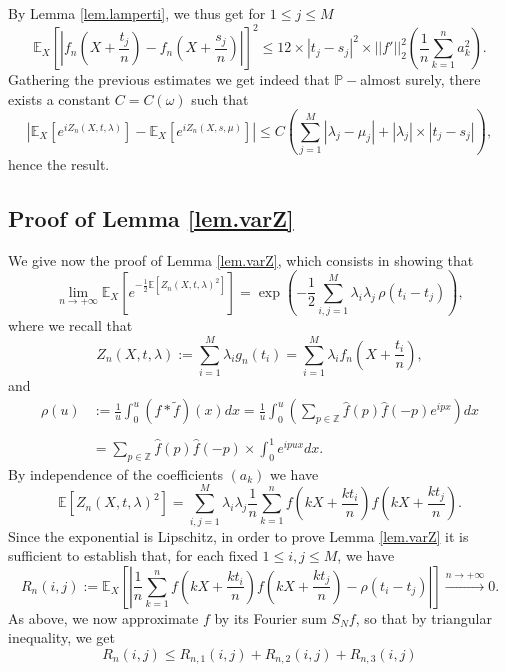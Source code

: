 \documentclass{svproc}
\newcommand \Esp {\mathbb{E}}
\newcommand \Z {\mathbb{Z}}
\begin{document}
By Lemma \ref{lem.lamperti}, we thus get for $1 \leq j \leq M$
\[
\displaystyle{ \mathbb E_X \left[\left| f_n\left(X+\frac{t_j}{n}\right)-f_n\left(X+\frac{s_j}{n}\right)\right|  \right]^2} \displaystyle{\leq   12 \times |t_j-s_j|^2 \times ||f'||_2^2 \left(  \frac{1}{n} \sum_{k=1}^n a_k^2   \right).}
\]
Gathering the previous estimates we get indeed that $\mathbb P-$almost surely, there exists a constant $C=C(\omega)$ such that 
\[
\left| \Esp_X \left[e^{iZ_n(X,t,\lambda)} \right] -\Esp_X \left[e^{iZ_n(X,s,\mu)} \right]  \right|\leq C\left(\sum_{j=1}^M \left| \lambda_j-\mu_j\right| +|\lambda_j|  \times|t_j - s_j|\right), 
\]
hence the result.




\subsection{Proof of Lemma \ref{lem.varZ}}\label{sec.varZ}
We give now the proof of Lemma \ref{lem.varZ}, which consists in showing that 
\[
\lim_{n \to +\infty}\Esp_X\left[e^{-\frac{1}{2}\Esp[Z_n(X,t,\lambda)^2]}\right]=\exp\left(-\frac{1}{2}\sum_{i,j=1}^{M} \lambda_i \lambda_j \, \rho(t_i-t_j) \right),
\]
where we recall that 
\[
Z_n(X,t,\lambda):=\sum_{i=1}^{M}\lambda_i g_n(t_i) =\sum_{i=1}^{M}\lambda_i f_n\left(X+\frac{t_i}{n}\right),
\]
and 
\[
\begin{array}{ll}
\rho(u) & \displaystyle :=\frac{1}{u}\int_0^{u}(f\ast \widetilde{f})(x)dx=\frac{1}{u}\int_0^{u}\left(\sum_{p\in \Z}\widehat{f}(p)\widehat{f}(-p) e^{i p x}\right) dx\\ 
\\
& \displaystyle= \sum_{p\in \Z}\widehat{f}(p)\widehat{f}(-p) \times \int_0^{1}e^{ip u x}dx.
\end{array}
\]
By independence of the coefficients $(a_k)$ we have 
$$\Esp[Z_n(X,t,\lambda)^2]= \sum_{i,j=1}^{M}\lambda_i \lambda_j \frac{1}{n}\sum_{k=1}^{n}f\left(kX+\frac{kt_i}{n}\right)f\left(kX+\frac{kt_j}{n}\right).$$
Since the exponential is Lipschitz, in order to prove Lemma \ref{lem.varZ} it is sufficient to establish that, for each fixed $1\leq i,j\leq M$, we have 
\begin{equation}\label{eqn.asymp}
R_{n}(i,j):= \mathbb E_X \left[\left|  \frac{1}{n}\sum_{k=1}^{n}f\left(kX+\frac{kt_i}{n}\right)f\left(kX+\frac{kt_j}{n}\right)- \rho(t_i-t_j)\right|\right]\xrightarrow{n \to +\infty} 0 .
\end{equation}
As above, we now approximate $f$ by its Fourier sum $S_Nf$, so that by triangular inequality, we get 
\[
R_n(i,j)\leq R_{n,1}(i,j)+R_{n,2}(i,j)+R_{n,3}(i,j)
\]
\end{document}
